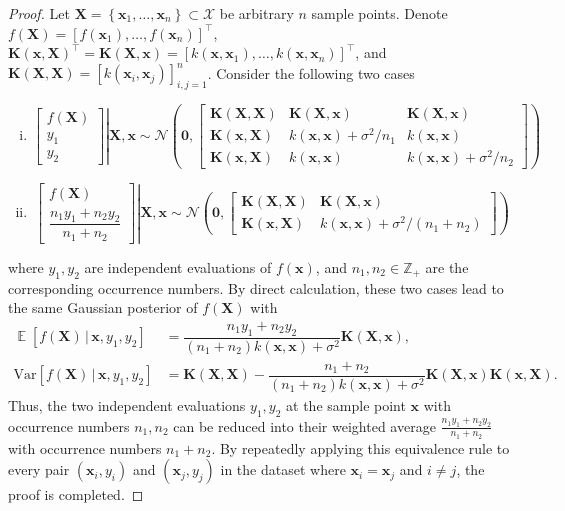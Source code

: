 \documentclass[11pt,en]{elegantpaper}
\newcommand{\domain}{\mathcal{X}}
\newcommand{\X}{\bm{X}}
\newcommand{\x}{\bm{x}}
\newcommand{\K}{\bm{K}}
\newcommand{\1}{\mathds{1}}
\newcommand{\set}[1]{\left\{#1\right\}}
\DeclareMathOperator*{\E}{\mathbb{E}}
\begin{document}
\begin{proof}
    Let $\X = \set{\x_1, \dots, \x_n} \subset \domain$ be arbitrary $n$ sample points.
    Denote $f(\X) = [f(\x_1), \dots, f(\x_n)]^{\top}$, $\K(\x, \X)^{\top} = \K(\X, \x) = [k(\x, \x_1), \dots, k(\x, \x_n)]^{\top}$, and $\K(\X, \X) = \left[ k\left(\x_i, \x_j\right) \right]_{i,j=1}^{n}$. Consider the following two cases
    \begin{enumerate}[(i)]
        \item \[
            \left.\begin{bmatrix}
                f(\X) \\ y_1 \\ y_2
            \end{bmatrix}
            \right| \X, \x \sim \mathcal{N}\left(\bm{0},
            \begin{bmatrix}
                \K(\X, \X) & \K(\X, \x)               & \K(\X, \x)
                \\
                \K(\x, \X) & k(\x, \x) + \sigma^2/n_1 & k(\x, \x)
                \\
                \K(\x, \X) & k(\x, \x)                & k(\x, \x) + \sigma^2/n_2
            \end{bmatrix}
            \right)
        \]
        \item \[
            \left.\begin{bmatrix}
                f(\X) \\ \dfrac{n_1 y_1 + n_2 y_2}{n_1 + n_2}
            \end{bmatrix}
            \right| \X, \x \sim \mathcal{N}\left(\bm{0},
            \begin{bmatrix}
                \K(\X, \X) & \K(\X, \x)
                \\
                \K(\x, \X) & k(\x, \x) + \sigma^2/(n_1 + n_2)
            \end{bmatrix}
            \right)
        \]
    \end{enumerate}
    where $y_1, y_2$ are independent evaluations of $f(\x)$, and $n_1, n_2 \in \mathbb{Z}_+$ are the corresponding occurrence numbers.
    By direct calculation, these two cases lead to the same Gaussian posterior of $f(\X)$ with
    \begin{align*}
        \E[f(\X) \,|\, \x, y_1, y_2]
        & = \dfrac{n_1 y_1 + n_2 y_2}{(n_1 + n_2) k(\x, \x) + \sigma^2} \K(\X, \x), 
        \\
        \mathrm{Var}[f(\X) \,|\, \x, y_1, y_2]
        & = \K(\X, \X) - \dfrac{n_1 + n_2}{(n_1 + n_2) k(\x, \x) + \sigma^2} \K(\X, \x) \K(\x, \X).
    \end{align*}
    Thus, the two independent evaluations $y_1, y_2$ at the sample point $\x$ with occurrence numbers $n_1, n_2$ can be reduced into their weighted average $\frac{n_1 y_1 + n_2 y_2}{n_1 + n_2}$ with occurrence numbers $n_1 + n_2$.
    By repeatedly applying this equivalence rule to every pair $(\x_i, y_i)$ and $(\x_j, y_j)$ in the dataset where $\x_i = \x_j$ and $i \neq j$, the proof is completed.
\end{proof}
\end{document}
